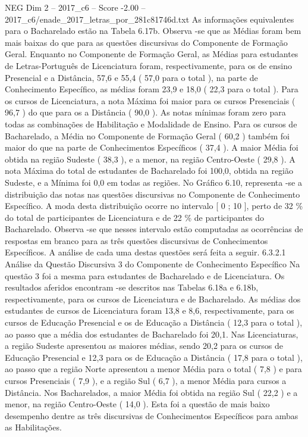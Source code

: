 \begin{textsample}{NEG Dim 2 – 2017\_c6 – Score -2.00 – 2017\_c6/enade\_2017\_letras\_por\_281c81746d.txt}
As informações equivalentes para o Bacharelado estão na Tabela 6.17b.
Observa -se que as Médias foram bem mais baixas do que para as questões discursivas do Componente de Formação Geral.
Enquanto no Componente de Formação Geral, as Médias para estudantes de Letras-Português de Licenciatura foram, respectivamente, para os de ensino Presencial e a Distância, 57,6 e 55,4 ( 57,0 para o total ), na parte de Conhecimento Específico, as médias foram 23,9 e 18,0 ( 22,3 para o total ).
Para os cursos de Licenciatura, a nota Máxima foi maior para os cursos Presenciais ( 96,7 ) do que para os a Distância ( 90,0 ).
As notas mínimas foram zero para todas as combinações de Habilitação e Modalidade de Ensino.
Para os cursos de Bacharelado, a Média no Componente de Formação Geral ( 60,2 ) também foi maior do que na parte de Conhecimentos Específicos ( 37,4 ).
A maior Média foi obtida na região Sudeste ( 38,3 ), e a menor, na região Centro-Oeste ( 29,8 ).
A nota Máxima do total de estudantes de Bacharelado foi 100,0, obtida na região Sudeste, e a Mínima foi 0,0 em todas as regiões.
No Gráfico 6.10, representa -se a distribuição das notas nas questões discursivas no Componente de Conhecimento Específico.
A moda desta distribuição ocorre no intervalo [ 0 ; 10 ], perto de 32 \% do total de participantes de Licenciatura e de 22 \% de participantes do Bacharelado.
Observa -se que nesses intervalo estão computadas as ocorrências de respostas em branco para as três questões discursivas de Conhecimentos Específicos.
A análise de cada uma destas questões será feita a seguir. 6.3.2.1 Análise da Questão Discursiva 3 do Componente de Conhecimento Específico Na questão 3 foi a mesma para estudantes de Bacharelado e de Licenciatura.
Os resultados aferidos encontram -se descritos nas Tabelas 6.18a e 6.18b, respectivamente, para os cursos de Licenciatura e de Bacharelado.
As médias dos estudantes de cursos de Licenciatura foram 13,8 e 8,6, respectivamente, para os cursos de Educação Presencial e os de Educação a Distância ( 12,3 para o total ), ao passo que a média dos estudantes de Bacharelado foi 20,1.
Nas Licenciaturas, a região Sudeste apresentou as maiores médias, sendo 20,2 para os cursos de Educação Presencial e 12,3 para os de Educação a Distância ( 17,8 para o total ), ao passo que a região Norte apresentou a menor Média para o total ( 7,8 ) e para cursos Presenciais ( 7,9 ), e a região Sul ( 6,7 ), a menor Média para cursos a Distância.
Nos Bacharelados, a maior Média foi obtida na região Sul ( 22,2 ) e a menor, na região Centro-Oeste ( 14,0 ).
Esta foi a questão de mais baixo desempenho dentre as três discursivas de Conhecimentos Específicos para ambas as Habilitações.

\end{textsample}
